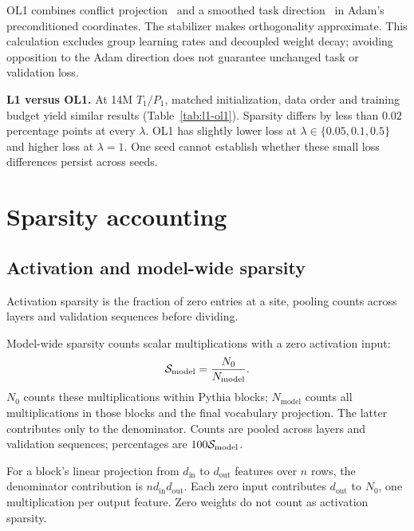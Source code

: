 OL1 combines conflict projection~\citep{yu2020pcgrad} and a smoothed task
direction~\citep{hsieh2024bloop} in Adam's preconditioned coordinates.
The stabilizer makes orthogonality approximate. This calculation excludes
group learning rates and decoupled weight decay; avoiding opposition to the
Adam direction does not guarantee unchanged task or validation loss.

\textbf{L1 versus OL1.}
At 14M $T_1/P_1$, matched initialization, data order and training budget yield
similar results (Table~\ref{tab:l1-ol1}). Sparsity differs by less than
$0.02$ percentage points at every $\lambda$. OL1 has slightly lower loss at
$\lambda\in\{0.05,0.1,0.5\}$ and higher loss at $\lambda=1$.
One seed cannot establish whether these small loss differences persist across seeds.





\section{Sparsity accounting}
\label{app:accounting}

\subsection{Activation and model-wide sparsity}

Activation sparsity is the fraction of zero entries at a site, pooling
counts across layers and validation sequences before dividing.

Model-wide sparsity counts scalar multiplications with a zero activation input:
\begin{equation}
\mathcal{S}_{\mathrm{model}}=\frac{N_0}{N_{\mathrm{model}}}.
\end{equation}
$N_0$ counts these multiplications within Pythia blocks;
$N_{\mathrm{model}}$ counts all multiplications in those blocks and the
final vocabulary projection. The latter contributes only to the denominator.
Counts are pooled across layers and validation sequences; percentages are
$100\mathcal{S}_{\mathrm{model}}$.

For a block's linear projection from $d_{\mathrm{in}}$ to
$d_{\mathrm{out}}$ features over $n$ rows, the denominator contribution is
$n d_{\mathrm{in}}d_{\mathrm{out}}$. Each zero input contributes
$d_{\mathrm{out}}$ to $N_0$, one multiplication per output feature.
Zero weights do not count as activation sparsity.

